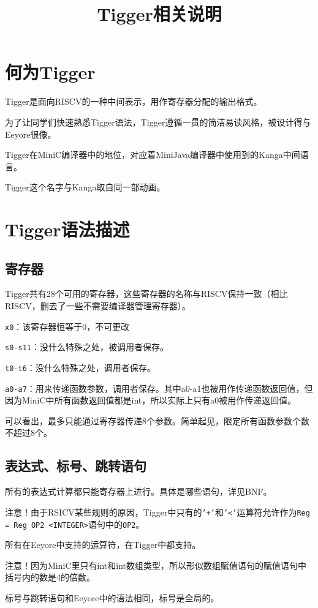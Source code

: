 \documentclass{ctexart}
\title{Tigger相关说明}
\date{}
\author{}
\begin{document}
\maketitle
\section{何为Tigger}
Tigger是面向RISCV的一种中间表示，用作寄存器分配的输出格式。

为了让同学们快速熟悉Tigger语法，Tigger遵循一贯的简洁易读风格，被设计得与Eeyore很像。

Tigger在MiniC编译器中的地位，对应着MiniJava编译器中使用到的Kanga中间语言。

Tigger这个名字与Kanga取自同一部动画。

\section{Tigger语法描述}
\subsection{寄存器}
Tigger共有28个可用的寄存器，这些寄存器的名称与RISCV保持一致（相比RISCV，删去了一些不需要编译器管理寄存器）。

\texttt{x0}：该寄存器恒等于0，不可更改

\texttt{s0-s11}：没什么特殊之处，被调用者保存。

\texttt{t0-t6}：没什么特殊之处，调用者保存。

\texttt{a0-a7}：用来传递函数参数，调用者保存。其中a0-a1也被用作传递函数返回值，但因为MiniC中所有函数返回值都是int，所以实际上只有a0被用作传递返回值。

可以看出，最多只能通过寄存器传递8个参数。简单起见，限定所有函数参数个数不超过8个。

\subsection{表达式、标号、跳转语句}
所有的表达式计算都只能寄存器上进行。具体是哪些语句，详见BNF。

注意！由于RSICV某些规则的原因，Tigger中只有的\texttt{'+'}和\texttt{'<'}运算符允许作为\texttt{Reg = Reg OP2 <INTEGER>}语句中的\texttt{OP2}。

所有在Eeyore中支持的运算符，在Tigger中都支持。

注意！因为MiniC里只有int和int数组类型，所以形似数组赋值语句的赋值语句中括号内的数是4的倍数。

标号与跳转语句和Eeyore中的语法相同，标号是全局的。
\end{document}
